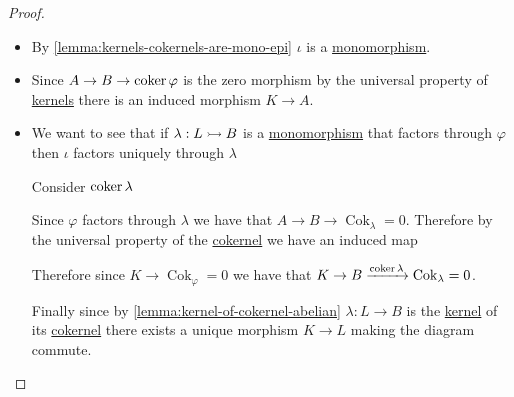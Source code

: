 \documentclass[../../../main]{subfiles}
\begin{document}
\begin{proof}~
  \begin{itemize}
    \item By \autoref{lemma:kernels-cokernels-are-mono-epi} \(\iota\) is a \hyperref[def:mono-epi-morphism]{monomorphism}.
    \item Since \(A \to B \to \operatorname*{coker} \varphi\) is the zero morphism by the universal property of \hyperref[def:categorical-kernel]{kernels} there is an induced morphism \(K \to A\).
    \item We want to see that if \(\lambda: L \rightarrowtail B\) is a \hyperref[def:mono-epi-morphism]{monomorphism} that factors through \(\varphi\) then \(\iota\) factors uniquely through \(\lambda\)
          \begin{center}
          \end{center}

          Consider \(\operatorname*{coker} \lambda\)
          \begin{center}
          \end{center}

          Since \(\varphi\) factors through \(\lambda\) we have that \(A \to B \to \operatorname{Cok}_{\lambda} = 0\). Therefore by the universal property of the \hyperref[def:categorical-cokernel]{cokernel} we have an induced map
           \begin{center}
          \end{center}

          Therefore since \(K \to \operatorname{Cok}_{\varphi} = 0\) we have that \(K \to B \xrightarrow{\operatorname*{coker} \lambda} \operatorname{Cok}_{\lambda} = 0\).

          Finally since by \autoref{lemma:kernel-of-cokernel-abelian} \(\lambda: L \to B\) is the \hyperref[def:categorical-kernel]{kernel} of its \hyperref[def:categorical-cokernel]{cokernel} there exists a unique morphism \(K \to L\) making the diagram commute.
  \end{itemize}
\end{proof}
\end{document}
